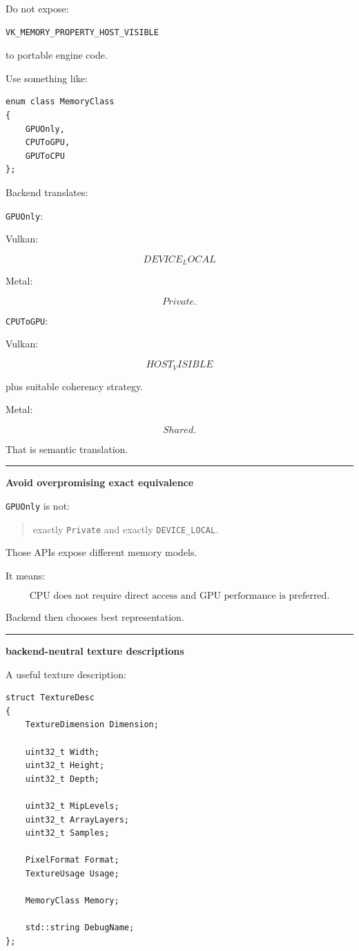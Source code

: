 Do not expose:

\begin{verbatim}
VK_MEMORY_PROPERTY_HOST_VISIBLE
\end{verbatim}

to portable engine code.

Use something like:

\begin{verbatim}
enum class MemoryClass
{
    GPUOnly,
    CPUToGPU,
    GPUToCPU
};
\end{verbatim}

Backend translates:

\texttt{GPUOnly}:

Vulkan:

\[
DEVICE_LOCAL
\]

Metal:

\[
Private.
\]

\texttt{CPUToGPU}:

Vulkan:

\[
HOST_VISIBLE
\]

plus suitable coherency strategy.

Metal:

\[
Shared.
\]

That is semantic translation.

\begin{center}\rule{0.5\linewidth}{0.5pt}\end{center}

\textbf{Avoid overpromising exact equivalence}

\texttt{GPUOnly} is not:

\begin{quote}
exactly \texttt{Private} and exactly \texttt{DEVICE\_LOCAL}.
\end{quote}

Those APIs expose different memory models.

It means:

\[
\boxed{
\text{CPU does not require direct access and GPU performance is preferred}.
}
\]

Backend then chooses best representation.

\begin{center}\rule{0.5\linewidth}{0.5pt}\end{center}

\textbf{backend-neutral texture descriptions}

A useful texture description:

\begin{verbatim}
struct TextureDesc
{
    TextureDimension Dimension;

    uint32_t Width;
    uint32_t Height;
    uint32_t Depth;

    uint32_t MipLevels;
    uint32_t ArrayLayers;
    uint32_t Samples;

    PixelFormat Format;
    TextureUsage Usage;

    MemoryClass Memory;

    std::string DebugName;
};
\end{verbatim}

